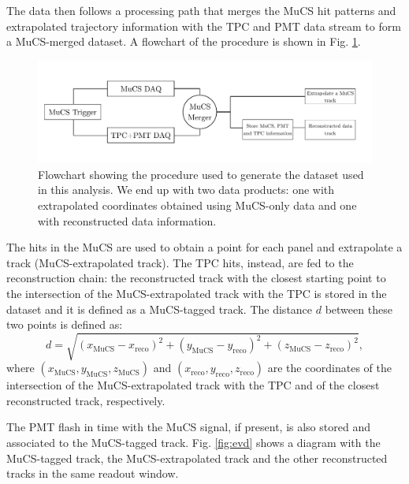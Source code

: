 \documentclass[a4paper]{scrartcl}
\begin{document}
The data then follows a processing path that merges the MuCS hit patterns and extrapolated trajectory information with the TPC and PMT data stream to form a MuCS-merged dataset. A flowchart of the procedure is shown in Fig. \ref{fig:scheme}.

\begin{figure}[htbp]
  \includegraphics[width=\linewidth]{figures/scheme.pdf}
  \caption{Flowchart showing the procedure used to generate the dataset used in this analysis. We end up with two data products: one with extrapolated coordinates obtained using MuCS-only data and one with reconstructed data information.} \label{fig:scheme}
\end{figure}

The hits in the MuCS are used to obtain a point for each panel and extrapolate a track (MuCS-extrapolated track). The TPC hits, instead, are fed to the reconstruction chain: the reconstructed track with the closest starting point to the intersection of the MuCS-extrapolated track with the TPC is stored in the dataset and it is defined as a MuCS-tagged track. The distance $d$ between these two points is defined as:
\begin{equation}\label{eq:d}
d = \sqrt{(x_{\mathrm{MuCS}}-x_{\mathrm{reco}})^2+(y_{\mathrm{MuCS}}-y_{\mathrm{reco}})^2+(z_{\mathrm{MuCS}}-z_{\mathrm{reco}})^2},
\end{equation}
where $(x_{\mathrm{MuCS}},y_{\mathrm{MuCS}},z_{\mathrm{MuCS}})$ and $(x_{\mathrm{reco}},y_{\mathrm{reco}},z_{\mathrm{reco}})$ are the coordinates of the intersection of the MuCS-extrapolated track with the TPC and of the closest reconstructed track, respectively.

The PMT flash in time with the MuCS signal, if present, is also stored and associated to the MuCS-tagged track.  Fig. \ref{fig:evd} shows a diagram with the MuCS-tagged track, the MuCS-extrapolated track and the other reconstructed tracks in the same readout window.
\end{document}
